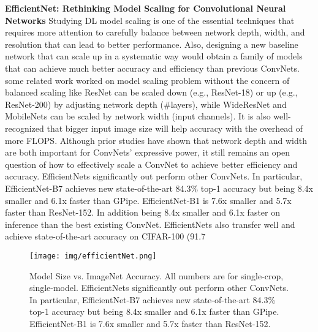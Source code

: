 \documentclass[10pt,twocolumn,letterpaper]{article}
\begin{document}
\textbf{EfficientNet: Rethinking Model Scaling for Convolutional Neural Networks
}\cite{Efficientnet}
Studying DL model scaling is one of the essential techniques that requires more attention to carefully balance between network depth, width, and resolution that can lead to better performance. Also, designing a new baseline network that can scale up in a systematic way would obtain a family of models that can achieve much better accuracy and efficiency than previous ConvNets.
\newline
\newline
some related work worked on model scaling problem without the concern of balanced scaling like ResNet \cite{resnet} can be scaled down (e.g., ResNet-18) or up (e.g., ResNet-200) by adjusting network depth (#layers), while WideResNet \cite{WideResNet} and MobileNets \cite{mobilenets} can be scaled by network width (input channels). It is also well-recognized that bigger input image size will help accuracy with the overhead of more FLOPS. Although prior studies have shown that network depth and width are both important for ConvNets’ expressive power, it still remains an open question of how to effectively scale a ConvNet to achieve better efficiency and accuracy.
\newline
EfficientNets significantly out perform other ConvNets. In particular, EfficientNet-B7 achieves new state-of-the-art 84.3\% top-1 accuracy but being 8.4x smaller and 6.1x faster than GPipe. EfficientNet-B1 is 7.6x smaller and 5.7x faster than ResNet-152.  In addition being 8.4x smaller and 6.1x faster on inference than the best existing ConvNet. EfficientNets also transfer well and achieve state-of-the-art accuracy on CIFAR-100 (91.7%
\begin{figure}[h]
\centering
\texttt{[image: img/efficientNet.png]}
\caption{
Model Size vs. ImageNet Accuracy. All numbers are
for single-crop, single-model. EfficientNets significantly out
perform other ConvNets. In particular, EfficientNet-B7 achieves
new state-of-the-art 84.3\% top-1 accuracy but being 8.4x smaller
and 6.1x faster than GPipe. EfficientNet-B1 is 7.6x smaller and
5.7x faster than ResNet-152.\cite{Efficientnet} \label{figure:efficientNet_results}}
\end{figure}
\end{document}
